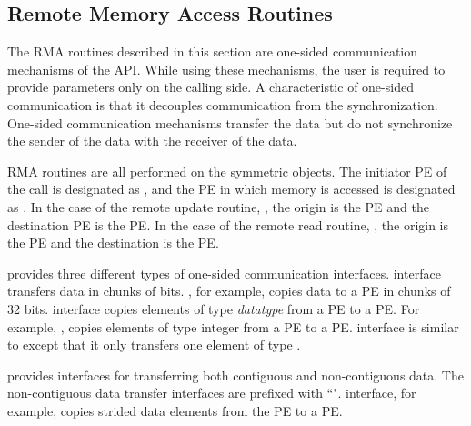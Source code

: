 \subsection{Remote Memory Access Routines}
\label{sec:rma}
The \ac{RMA} routines described in this section are one-sided communication
mechanisms of the \openshmem{} \ac{API}. While using these mechanisms, the user is required to provide parameters only on the calling side. A characteristic of one-sided communication is that it decouples communication from
the synchronization. One-sided communication mechanisms transfer 
the data but do not synchronize the sender of the data with the receiver of the data. 

\openshmem{} \ac{RMA} routines are all performed on the symmetric objects. 
The initiator \ac{PE} of the call is designated as \source{}, and the 
\ac{PE} in which memory is accessed is designated as \dest{}. In the case of the remote
update routine, \PUT{}, the origin is the \source{} \ac{PE} and the 
destination \ac{PE} is the \dest{} PE. In the case of the remote read routine, \GET{}, 
the origin is the \dest{} \ac{PE} and the destination is the \source{} \ac{PE}.

\openshmem{} provides three different types of one-sided communication interfaces. 
 interface transfers data in chunks 
of bits. , for example, copies data to a \dest{} \ac{PE} in chunks of 32 bits.  interface copies elements of type 
\textit{datatype} from a \source{} \ac{PE} to a \dest{} \ac{PE}. 
For example, , copies elements
of type integer from a \source{} \ac{PE} to a \dest{} \ac{PE}. 
 interface is similar to  except that it only transfers one element of type .

\openshmem{} provides interfaces for transferring both contiguous and 
non-contiguous data. The non-contiguous data transfer interfaces are prefixed 
with ``".  interface, for example, copies strided data elements from the \source{} \ac{PE} to a \dest{} \ac{PE}. 


